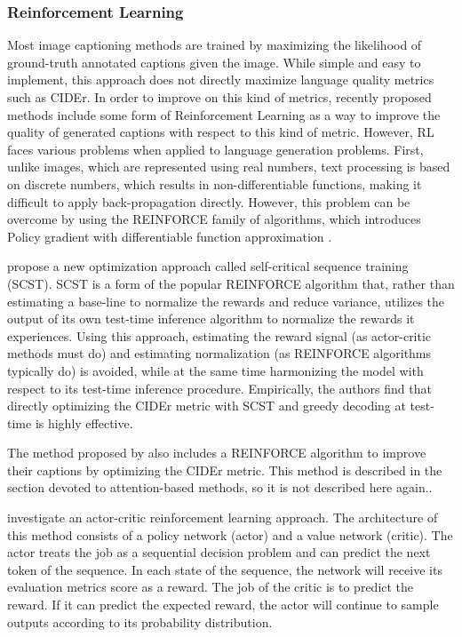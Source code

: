 \subsubsection{Reinforcement Learning}

Most image captioning methods are trained by maximizing the likelihood of ground-truth annotated captions given the image. While simple and easy to implement, this approach does not directly maximize language quality metrics such as CIDEr. In order to improve on this kind of metrics, recently proposed methods include some form of Reinforcement Learning as a way to improve the quality of generated captions with respect to this kind of metric. However, RL faces various problems when applied to language generation problems. First, unlike images, which are represented using real numbers, text processing is based on discrete numbers, which results in non-differentiable functions, making it difficult to apply back-propagation directly. However, this problem can be overcome by using the REINFORCE family of algorithms, which introduces Policy gradient with differentiable function approximation \citep{Sutton1999}.

\cite{Rennie2017} propose a new optimization approach called self-critical sequence training (SCST). SCST is a form of the popular REINFORCE algorithm that, rather than estimating a base-line to normalize the rewards and reduce variance, utilizes the output of its own test-time inference algorithm to normalize the rewards it experiences. Using this approach, estimating the reward signal (as actor-critic methods must do) and estimating normalization (as REINFORCE algorithms typically do) is avoided, while at the same time harmonizing the model with respect to its test-time inference procedure. Empirically, the authors find that directly optimizing the CIDEr metric with SCST and greedy decoding at test-time is highly effective.

The method proposed by \citet{Li2018_VS-LSTM} also includes a REINFORCE algorithm to improve their captions by optimizing the CIDEr metric. This method is described in the section devoted to attention-based methods, so it is not described here again..

\cite{Zhang2017} investigate an actor-critic reinforcement learning \citep{Barto1983} approach. The architecture of this method consists of a policy network (actor) and a value network (critic). The actor treats the job as a sequential decision problem and can predict the next token of the sequence. In each state of the sequence, the network will receive its evaluation metrics score as a reward. The job of the critic is to predict the reward. If it can predict the expected reward, the actor will continue to sample outputs according to its probability distribution. 

